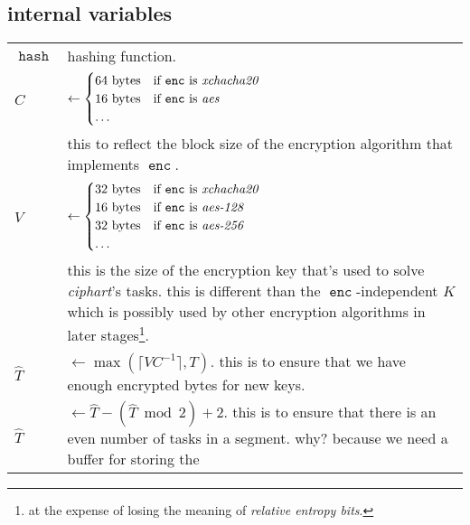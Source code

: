 \documentclass[twocolumn]{article}
\DeclareMathOperator{\enc}{\mathtt{enc}}
\DeclareMathOperator{\maxf}{max}
\DeclareMathOperator{\hash}{\mathtt{hash}}
\begin{document}
\subsection{internal variables}
\begin{tabularx}{\columnwidth}{lX}
    $\hash$ & hashing function.\\
    $C$         & $\gets \begin{cases}
                        64 \text{ bytes} & \text{if $\enc$ is
                                            \emph{xchacha20}}\\
                        16 \text{ bytes} & \text{if $\enc$ is \emph{aes}}\\
                        \ldots & \\
                     \end{cases}$\\
                & this to reflect the block size of the encryption
                    algorithm that implements $\enc$.\\
    $V$ & $\gets \begin{cases}
                        32 \text{ bytes} & \text{if $\enc$ is
                                            \emph{xchacha20}}\\
                        16 \text{ bytes} & \text{if $\enc$ is
                            \emph{aes-128}}\\
                        32 \text{ bytes} & \text{if $\enc$ is
                            \emph{aes-256}}\\
                        \ldots & \\
                     \end{cases}$\\
                & this is the size of the encryption key that's used to
                    solve \emph{ciphart}'s tasks.  this is different than
                    the $\enc$-independent $K$ which is
                    possibly used by other encryption algorithms in later
                    stages\footnote{at the expense of losing the meaning of
                    \emph{relative entropy bits}.}.\\
    $\hat T$    & $\gets \maxf(\lceil V C^{-1}\rceil, T)$.  this
                    is to ensure that we have enough encrypted bytes for
                    new keys.\\
    $\hat T$    & $\gets \hat T - (\hat T \bmod 2) + 2$.  this is to ensure
                    that there is an even number of tasks in a segment.
                    why?  because we need a buffer for storing the

\end{tabularx}
\end{document}
